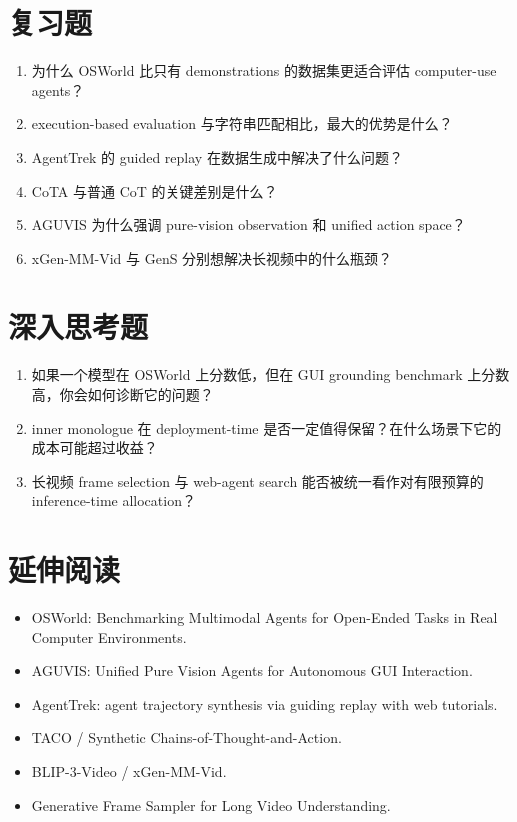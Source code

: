 \documentclass[a4paper]{article}
\begin{document}
\section{复习题}
\begin{enumerate}
\item 为什么 OSWorld 比只有 demonstrations 的数据集更适合评估 computer-use agents？
\item execution-based evaluation 与字符串匹配相比，最大的优势是什么？
\item AgentTrek 的 guided replay 在数据生成中解决了什么问题？
\item CoTA 与普通 CoT 的关键差别是什么？
\item AGUVIS 为什么强调 pure-vision observation 和 unified action space？
\item xGen-MM-Vid 与 GenS 分别想解决长视频中的什么瓶颈？
\end{enumerate}

\section{深入思考题}
\begin{enumerate}
\item 如果一个模型在 OSWorld 上分数低，但在 GUI grounding benchmark 上分数高，你会如何诊断它的问题？
\item inner monologue 在 deployment-time 是否一定值得保留？在什么场景下它的成本可能超过收益？
\item 长视频 frame selection 与 web-agent search 能否被统一看作对有限预算的 inference-time allocation？
\end{enumerate}

\section{延伸阅读}
\begin{itemize}
\item OSWorld: Benchmarking Multimodal Agents for Open-Ended Tasks in Real Computer Environments.
\item AGUVIS: Unified Pure Vision Agents for Autonomous GUI Interaction.
\item AgentTrek: agent trajectory synthesis via guiding replay with web tutorials.
\item TACO / Synthetic Chains-of-Thought-and-Action.
\item BLIP-3-Video / xGen-MM-Vid.
\item Generative Frame Sampler for Long Video Understanding.
\end{itemize}
\end{document}
